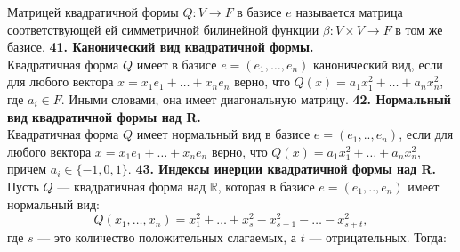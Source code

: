 \documentclass{article}
\begin{document}
Матрицей квадратичной формы $Q \colon V \to F$   в базисе $e$ называется матрица  соответствующей ей симметричной билинейной функции $\beta \colon V \times V \rightarrow F$ в том же базисе. 
\newline
\newline
\textbf{41. Канонический вид квадратичной формы.}\\
Квадратичная форма $Q$ имеет в базисе $e = (e_1, \ldots, e_n)$ канонический вид, если для любого вектора $x = x_1e_1 + \ldots + x_ne_n$ верно, что $Q(x) = a_1x_1^2 +\ldots + a_nx_n^2$, где $a_i \in F$. Иными словами, она имеет диагональную матрицу.
\newpage
\textbf{42. Нормальный вид квадратичной формы над R.}\\
Квадратичная форма $Q$ имеет нормальный вид в базисе $e = (e_1,..,e_n)$, если для любого вектора $x = x_1e_1 + \ldots + x_ne_n$ верно, что $Q(x) = a_1x_1^2 +\ldots + a_nx_n^2$, причем $a_i \in \{-1, 0, 1\}$.  
\newline
\newline
\textbf{43. Индексы инерции квадратичной формы над R.}\\
Пусть $Q$ --- квадратичная форма над $\mathbb{R}$, которая в базисе $e =  (e_1,..,e_n)$ имеет нормальный вид: 
$$
Q(x_1, \ldots, x_n) = x_1^2 + \ldots + x_s^2 - x_{s + 1}^2 - \ldots - x_{s + t}^2,
$$
где $s$ --- это количество положительных слагаемых, а $t$ --- отрицательных. Тогда:
\end{document}
